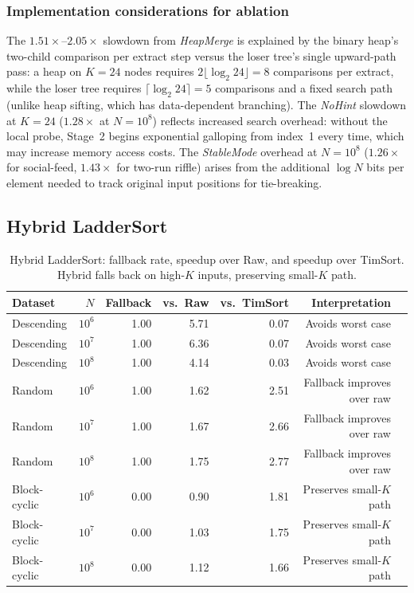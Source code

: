 \documentclass[12pt,a4paper]{article}
\theoremstyle{plain}
\theoremstyle{definition}
\begin{document}
\subsubsection{Implementation considerations for ablation}
The $1.51\times$--$2.05\times$ slowdown from \emph{HeapMerge} is explained by
the binary heap's two-child comparison per extract step versus the loser
tree's single upward-path pass: a heap on $K=24$ nodes requires
$2\lfloor\log_2 24\rfloor = 8$ comparisons per extract, while the loser tree
requires $\lceil\log_2 24\rceil = 5$ comparisons and a fixed search path (unlike
heap sifting, which has data-dependent branching). The \emph{NoHint} slowdown at $K=24$ ($1.28\times$
at $N=10^8$) reflects increased search overhead: without the local probe, Stage~2
begins exponential galloping from index~1 every time, which may increase memory
access costs. The \emph{StableMode} overhead at $N=10^8$
($1.26\times$ for social-feed, $1.43\times$ for two-run riffle) arises from
the additional $\log N$ bits per element needed to track original input positions
for tie-breaking.

\subsection{Hybrid LadderSort}
\label{sec:hybrid}

\begin{table}[H]
\centering\scriptsize
\caption{Hybrid LadderSort: fallback rate, speedup over Raw, and speedup over
  TimSort.  Hybrid falls back on high-$K$ inputs, preserving small-$K$ path.}
\label{tab:phase4-hybrid}
\begin{tabularx}{\linewidth}{@{}lrrrrrX@{}}
\toprule
Dataset & $N$ & Fallback & vs.\ Raw & vs.\ TimSort & Interpretation \\
\midrule
Descending   & $10^6$ & 1.00 & 5.71 & 0.07 & Avoids worst case \\
Descending   & $10^7$ & 1.00 & 6.36 & 0.07 & Avoids worst case \\
Descending   & $10^8$ & 1.00 & 4.14 & 0.03 & Avoids worst case \\
Random       & $10^6$ & 1.00 & 1.62 & 2.51 & Fallback improves over raw \\
Random       & $10^7$ & 1.00 & 1.67 & 2.66 & Fallback improves over raw \\
Random       & $10^8$ & 1.00 & 1.75 & 2.77 & Fallback improves over raw \\
Block-cyclic & $10^6$ & 0.00 & 0.90 & 1.81 & Preserves small-$K$ path \\
Block-cyclic & $10^7$ & 0.00 & 1.03 & 1.75 & Preserves small-$K$ path \\
Block-cyclic & $10^8$ & 0.00 & 1.12 & 1.66 & Preserves small-$K$ path \\
\bottomrule
\end{tabularx}
\end{table}
\end{document}
